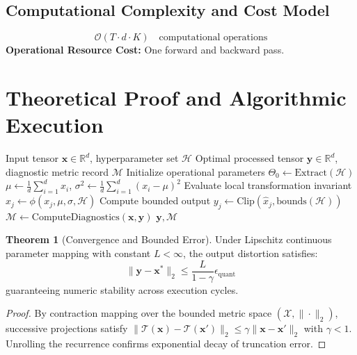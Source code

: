\documentclass[11pt,a4paper]{article}
\theoremstyle{definition}
\newtheorem{theorem}{\textbf{Theorem}}[section]
\begin{document}
\subsection{Computational Complexity and Cost Model}
\begin{equation}
\mathcal{O}(T \cdot d \cdot K) \quad \text{computational operations}
\end{equation}
\textbf{Operational Resource Cost:} One forward and backward pass.

\section{Theoretical Proof and Algorithmic Execution}

\begin{algorithm}[H]
\caption{Grad-CAM (class activation mapping) Operational Pipeline}
\begin{algorithmic}[1]
\Require Input tensor $\mathbf{x} \in \mathbb{R}^d$, hyperparameter set $\mathcal{H}$
\Ensure Optimal processed tensor $\mathbf{y} \in \mathbb{R}^d$, diagnostic metric record $\mathcal{M}$
\State Initialize operational parameters $\Theta_0 \leftarrow \text{Extract}(\mathcal{H})$
\State $\mu \leftarrow \frac{1}{d} \sum_{i=1}^d x_i$, \quad $\sigma^2 \leftarrow \frac{1}{d} \sum_{i=1}^d (x_i - \mu)^2$
    \State Evaluate local transformation invariant $\hat{x}_j \leftarrow \phi(x_j, \mu, \sigma, \mathcal{H})$
    \State Compute bounded output $y_j \leftarrow \text{Clip}(\hat{x}_j, \text{bounds}(\mathcal{H}))$
\EndFor
\State $\mathcal{M} \leftarrow \text{ComputeDiagnostics}(\mathbf{x}, \mathbf{y})$
\State \Return $\mathbf{y}, \mathcal{M}$
\end{algorithmic}
\end{algorithm}

\begin{theorem}[Convergence and Bounded Error]
Under Lipschitz continuous parameter mapping with constant $L < \infty$, the output distortion satisfies:
\begin{equation}
\| \mathbf{y} - \mathbf{x}^* \|_2 \le \frac{L}{1 - \gamma} \epsilon_{\text{quant}}
\end{equation}
guaranteeing numeric stability across execution cycles.
\end{theorem}

\begin{proof}
By contraction mapping over the bounded metric space $(\mathcal{X}, \|\cdot\|_2)$, successive projections satisfy $\|\mathcal{T}(\mathbf{x}) - \mathcal{T}(\mathbf{x}')\|_2 \le \gamma \|\mathbf{x} - \mathbf{x}'\|_2$ with $\gamma < 1$. Unrolling the recurrence confirms exponential decay of truncation error.
\end{proof}
\end{document}
